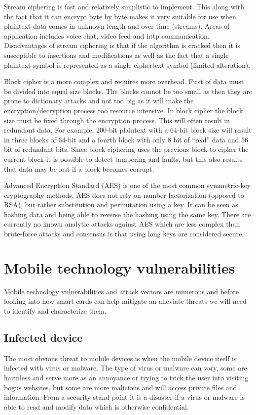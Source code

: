 Stream ciphering is fast and relatively simplistic to implement. This along with the fact that it can encrypt byte by byte makes it very suitable for use when plaintext data comes in  unknown length and over time (streams). Areas of application includes voice chat, video feed and http communication. Disadvantages of stream ciphering is that if the algorithm is cracked then it is susceptible to insertions and modifications as well as the fact that a single plaintext symbol is represented as a single ciphertext symbol (limited alteration).

Block cipher is a more complex and requires more overhead. First of data must be divided into equal size blocks. The blocks cannot be too small as then they are prone to dictionary attacks and not too big as it will make the encryption/decryption process too resource intensive. In block cipher the block size must be fixed through the encryption process. This will often result in redundant data. For example, 200-bit plaintext with a 64-bit block size will result in three blocks of 64-bit and a fourth block with only 8 bit of ``real'' data and 56 bit of redundant bits. Since block ciphering uses the previous block to cipher the current block it is possible to detect tampering and faults, but this also results that data may be lost if a block becomes corrupt.

Advanced Encryption Standard (AES) is one of the most common symmetric-key cryptography methods. AES does not rely on number factorization (opposed to RSA), but rather substitution and permutation using a key. It can be seen as hashing data and being able to reverse the hashing using the same key. There are currently no known analytic attacks against AES which are less complex than brute-force attacks and consensus is that using long keys are considered secure.

\section{Mobile technology vulnerabilities}
Mobile technology vulnerabilities and attack vectors are numerous and before looking into how smart cards can help mitigate an alleviate threats we will need to identify and characterize them.
\subsection{Infected device}
The most obvious threat to mobile devices is when the mobile device itself is infected with virus or malware. The type of virus or malware can vary, some are harmless and serve more as an annoyance or trying to trick the user into visiting bogus websites, but some are more malicious and will access private files and information. From a security stand-point it is a disaster if a virus or malware is able to read and modify data which is otherwise confidential.

